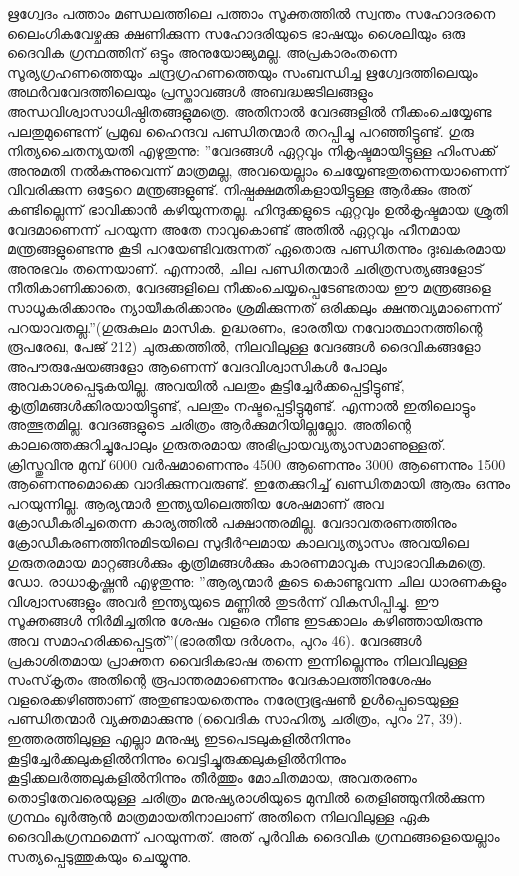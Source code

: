 ഋഗ്വേദം പത്താം മണ്ഡലത്തിലെ പത്താം സൂക്തത്തില്‍ സ്വന്തം സഹോദരനെ ലൈംഗികവേഴ്ചക്കു ക്ഷണിക്കുന്ന സഹോദരിയുടെ ഭാഷയും ശൈലിയും ഒരു ദൈവിക ഗ്രന്ഥത്തിന് ഒട്ടും അനുയോജ്യമല്ല. അപ്രകാരംതന്നെ സൂര്യഗ്രഹണത്തെയും ചന്ദ്രഗ്രഹണത്തെയും സംബന്ധിച്ച ഋഗ്വേദത്തിലെയും അഥര്‍വവേദത്തിലെയും പ്രസ്താവങ്ങള്‍ അബദ്ധജടിലങ്ങളും അന്ധവിശ്വാസാധിഷ്ഠിതങ്ങളുമത്രെ. അതിനാല്‍ വേദങ്ങളില്‍ നീക്കംചെയ്യേണ്ട പലതുമുണ്ടെന്ന് പ്രമുഖ ഹൈന്ദവ പണ്ഡിതന്മാര്‍ തറപ്പിച്ചു പറഞ്ഞിട്ടുണ്ട്. ഗുരു നിത്യചൈതന്യയതി എഴുതുന്നു: ''വേദങ്ങള്‍ ഏറ്റവും നികൃഷ്ടമായിട്ടുള്ള ഹിംസക്ക് അനുമതി നല്‍കുന്നുവെന്ന് മാത്രമല്ല, അവയെല്ലാം ചെയ്യേണ്ടതുതന്നെയാണെന്ന് വിവരിക്കുന്ന ഒട്ടേറെ മന്ത്രങ്ങളുണ്ട്. നിഷ്പക്ഷമതികളായിട്ടുള്ള ആര്‍ക്കും അത് കണ്ടില്ലെന്ന് ഭാവിക്കാന്‍ കഴിയുന്നതല്ല. ഹിന്ദുക്കളുടെ ഏറ്റവും ഉല്‍കൃഷ്ടമായ ശ്രുതി വേദമാണെന്ന് പറയുന്ന അതേ നാവുകൊണ്ട് അതില്‍ ഏറ്റവും ഹീനമായ മന്ത്രങ്ങളുണ്ടെന്നു കൂടി പറയേണ്ടിവരുന്നത് ഏതൊരു പണ്ഡിതന്നും ദുഃഖകരമായ അനുഭവം തന്നെയാണ്. എന്നാല്‍, ചില പണ്ഡിതന്മാര്‍ ചരിത്രസത്യങ്ങളോട് നീതികാണിക്കാതെ, വേദങ്ങളിലെ നീക്കംചെയ്യപ്പെടേണ്ടതായ ഈ മന്ത്രങ്ങളെ സാധൂകരിക്കാനും ന്യായീകരിക്കാനും ശ്രമിക്കുന്നത് ഒരിക്കലും ക്ഷന്തവ്യമാണെന്ന് പറയാവതല്ല.''(ഗുരുകുലം മാസിക. ഉദ്ധരണം, ഭാരതീയ നവോത്ഥാനത്തിന്റെ രൂപരേഖ, പേജ് 212)
ചുരുക്കത്തില്‍, നിലവിലുള്ള വേദങ്ങള്‍ ദൈവികങ്ങളോ അപൗരുഷേയങ്ങളോ ആണെന്ന് വേദവിശ്വാസികള്‍ പോലും അവകാശപ്പെടുകയില്ല. അവയില്‍ പലതും കൂട്ടിച്ചേര്‍ക്കപ്പെട്ടിട്ടുണ്ട്, കൃത്രിമങ്ങള്‍ക്കിരയായിട്ടുണ്ട്, പലതും നഷ്ടപ്പെട്ടിട്ടുമുണ്ട്. എന്നാല്‍ ഇതിലൊട്ടും അത്ഭുതമില്ല. വേദങ്ങളുടെ ചരിത്രം ആര്‍ക്കുമറിയില്ലല്ലോ. അതിന്റെ കാലത്തെക്കുറിച്ചുപോലും ഗുരുതരമായ അഭിപ്രായവ്യത്യാസമാണുള്ളത്. ക്രിസ്തുവിനു മുമ്പ് 6000 വര്‍ഷമാണെന്നും 4500 ആണെന്നും 3000 ആണെന്നും 1500 ആണെന്നുമൊക്കെ വാദിക്കുന്നവരുണ്ട്. ഇതേക്കുറിച്ച് ഖണ്ഡിതമായി ആരും ഒന്നും പറയുന്നില്ല. ആര്യന്മാര്‍ ഇന്ത്യയിലെത്തിയ ശേഷമാണ് അവ ക്രോഡീകരിച്ചതെന്ന കാര്യത്തില്‍ പക്ഷാന്തരമില്ല. വേദാവതരണത്തിനും ക്രോഡീകരണത്തിനുമിടയിലെ സുദീര്‍ഘമായ കാലവ്യത്യാസം അവയിലെ ഗുരുതരമായ മാറ്റങ്ങള്‍ക്കും കൃത്രിമങ്ങള്‍ക്കും കാരണമാവുക സ്വാഭാവികമത്രെ. ഡോ. രാധാകൃഷ്ണന്‍ എഴുതുന്നു: ''ആര്യന്മാര്‍ കൂടെ കൊണ്ടുവന്ന ചില ധാരണകളും വിശ്വാസങ്ങളും അവര്‍ ഇന്ത്യയുടെ മണ്ണില്‍ തുടര്‍ന്ന് വികസിപ്പിച്ചു. ഈ സൂക്തങ്ങള്‍ നിര്‍മിച്ചതിനു ശേഷം വളരെ നീണ്ട ഇടക്കാലം കഴിഞ്ഞായിരുന്നു അവ സമാഹരിക്കപ്പെട്ടത്''(ഭാരതീയ ദര്‍ശനം, പുറം 46).
വേദങ്ങള്‍ പ്രകാശിതമായ പ്രാക്തന വൈദികഭാഷ തന്നെ ഇന്നില്ലെന്നും നിലവിലുള്ള സംസ്‌കൃതം അതിന്റെ രൂപാന്തരമാണെന്നും വേദകാലത്തിനുശേഷം വളരെക്കഴിഞ്ഞാണ് അതുണ്ടായതെന്നും നരേന്ദ്രഭൂഷണ്‍ ഉള്‍പ്പെടെയുള്ള പണ്ഡിതന്മാര്‍ വ്യക്തമാക്കുന്നു (വൈദിക സാഹിത്യ ചരിത്രം, പുറം 27, 39).
ഇത്തരത്തിലുള്ള എല്ലാ മനുഷ്യ ഇടപെടലുകളില്‍നിന്നും കൂട്ടിച്ചേര്‍ക്കലുകളില്‍നിന്നും വെട്ടിച്ചുരുക്കലുകളില്‍നിന്നും കൂട്ടിക്കലര്‍ത്തലുകളില്‍നിന്നും തീര്‍ത്തും മോചിതമായ, അവതരണം തൊട്ടിതേവരെയുള്ള ചരിത്രം മനുഷ്യരാശിയുടെ മുമ്പില്‍ തെളിഞ്ഞുനില്‍ക്കുന്ന ഗ്രന്ഥം ഖുര്‍ആന്‍ മാത്രമായതിനാലാണ് അതിനെ നിലവിലുള്ള ഏക ദൈവികഗ്രന്ഥമെന്ന് പറയുന്നത്. അത് പൂര്‍വിക ദൈവിക ഗ്രന്ഥങ്ങളെയെല്ലാം സത്യപ്പെടുത്തുകയും ചെയ്യുന്നു.
